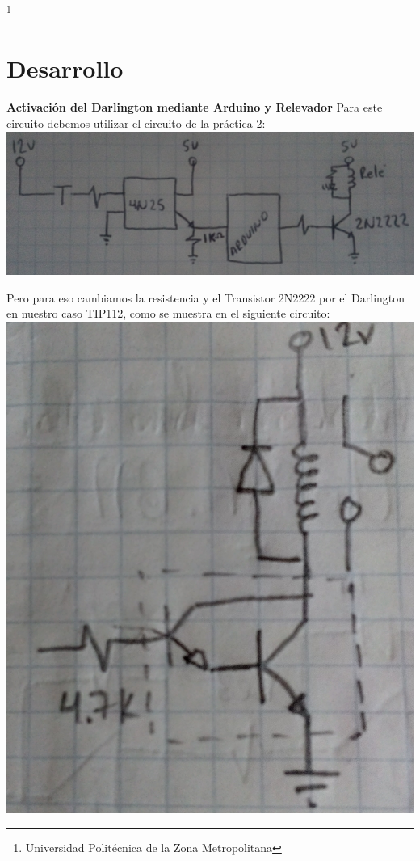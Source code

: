 \documentclass[10pt,a4paper]{article}
\begin{document}
\footnote{Universidad Politécnica de la Zona Metropolitana}

\newpage
\section{Desarrollo}
\textbf{Activación del Darlington mediante Arduino y Relevador}
Para este circuito debemos utilizar el circuito de la práctica 2: \\


\centering
\includegraphics[scale=0.4]{3.PNG}


Pero para eso cambiamos la resistencia y el Transistor 2N2222 por el Darlington en nuestro caso TIP112, como se muestra en el siguiente circuito: \\

\centering
\includegraphics[scale=0.05]{4.jpg}
\end{document}
